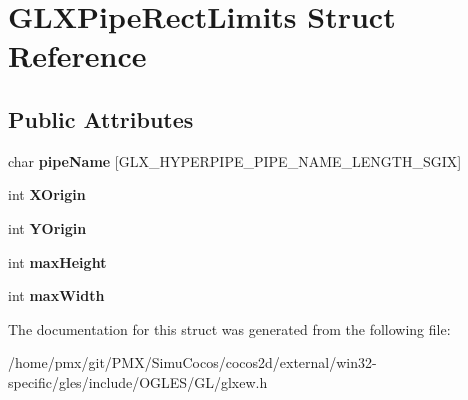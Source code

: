 \hypertarget{structGLXPipeRectLimits}{}\section{G\+L\+X\+Pipe\+Rect\+Limits Struct Reference}
\label{structGLXPipeRectLimits}
\subsection*{Public Attributes}
\begin{DoxyCompactItemize}
\item 
\mbox{\label{structGLXPipeRectLimits_a048e870a1e04bc5321d629e803cc04e1}} 
char {\bfseries pipe\+Name} \mbox{[}G\+L\+X\+\_\+\+H\+Y\+P\+E\+R\+P\+I\+P\+E\+\_\+\+P\+I\+P\+E\+\_\+\+N\+A\+M\+E\+\_\+\+L\+E\+N\+G\+T\+H\+\_\+\+S\+G\+IX\mbox{]}
\item 
\mbox{\label{structGLXPipeRectLimits_a3e5a965059d9f5d2ca42acd35af5bb9b}} 
int {\bfseries X\+Origin}
\item 
\mbox{\label{structGLXPipeRectLimits_a50e06bcf0dae95854be7d93a515199e9}} 
int {\bfseries Y\+Origin}
\item 
\mbox{\label{structGLXPipeRectLimits_a27572e499c0d3280031c2ad8e387c0c1}} 
int {\bfseries max\+Height}
\item 
\mbox{\label{structGLXPipeRectLimits_a8662c7a712b30620e25fc994adf337a1}} 
int {\bfseries max\+Width}
\end{DoxyCompactItemize}


The documentation for this struct was generated from the following file\+:\begin{DoxyCompactItemize}
\item 
/home/pmx/git/\+P\+M\+X/\+Simu\+Cocos/cocos2d/external/win32-\/specific/gles/include/\+O\+G\+L\+E\+S/\+G\+L/glxew.\+h\end{DoxyCompactItemize}
